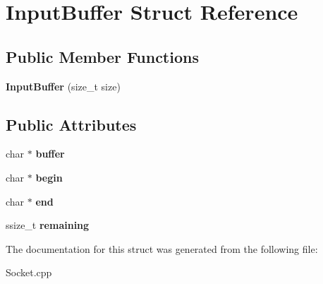 \hypertarget{struct_input_buffer}{\section{Input\-Buffer Struct Reference}
\label{struct_input_buffer}
}
\subsection*{Public Member Functions}
\begin{DoxyCompactItemize}
\item 
\hypertarget{struct_input_buffer_a9409ec8e4581caa99dcac1af963349b5}{{\bfseries Input\-Buffer} (size\-\_\-t size)}\label{struct_input_buffer_a9409ec8e4581caa99dcac1af963349b5}

\end{DoxyCompactItemize}
\subsection*{Public Attributes}
\begin{DoxyCompactItemize}
\item 
\hypertarget{struct_input_buffer_aee7a717b6cf023deabe9910410e6cfb6}{char $\ast$ {\bfseries buffer}}\label{struct_input_buffer_aee7a717b6cf023deabe9910410e6cfb6}

\item 
\hypertarget{struct_input_buffer_a2f05121c4fb8571845cc22d083c6da46}{char $\ast$ {\bfseries begin}}\label{struct_input_buffer_a2f05121c4fb8571845cc22d083c6da46}

\item 
\hypertarget{struct_input_buffer_a52ba71c71b9b955b8369fc5217e3c4b6}{char $\ast$ {\bfseries end}}\label{struct_input_buffer_a52ba71c71b9b955b8369fc5217e3c4b6}

\item 
\hypertarget{struct_input_buffer_a621d633184a77c449e7b07d705870ae2}{ssize\-\_\-t {\bfseries remaining}}\label{struct_input_buffer_a621d633184a77c449e7b07d705870ae2}

\end{DoxyCompactItemize}


The documentation for this struct was generated from the following file\-:\begin{DoxyCompactItemize}
\item 
Socket.\-cpp\end{DoxyCompactItemize}
